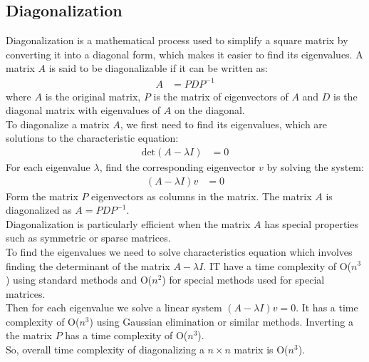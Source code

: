\documentclass{article}
\begin{document}
\subsection*{Diagonalization}
Diagonalization is a mathematical process used to simplify a square matrix by converting it into a diagonal form, which makes it easier to find its eigenvalues. A matrix $A$ is said to be diagonalizable if it can be written as:
\begin{align*}
    A &=PD{P^{-1}}
\end{align*}
where $A$ is the original matrix, $P$ is the matrix of eigenvectors of $A$ and $D$ is the diagonal matrix with eigenvalues of $A$ on the diagonal.
\\To diagonalize a matrix $A$, we first need to find its eigenvalues, which are solutions to the characteristic equation:
\begin{align*}
    \text{det}(A-{\lambda}I)&=0
\end{align*}
For each eigenvalue $\lambda$, find the corresponding eigenvector $v$ by solving the system:
\begin{align*}
    (A-{\lambda}I)v&=0
\end{align*}
Form the matrix $P$ eigenvectors as columns in the matrix. The matrix $A$ is diagonalized as $A=PD{P^{-1}}$.
\\Diagonalization is particularly efficient when the matrix $A$ has special properties such as symmetric or sparse matrices.
\\To find the eigenvalues we need to solve characteristics equation which involves finding the determinant of the matrix $A-{\lambda}I$. IT have a time complexity of O($n^3$) using standard methods and O($n^2$) for special methods used for special matrices.
\\Then for each eigenvalue we solve a linear system $(A-{\lambda}I)v=0$. It has a time complexity of O($n^3$) using Gaussian elimination or similar methods. Inverting a the matrix $P$ has a time complexity of O($n^3$).
\\So, overall time complexity of diagonalizing a $n{\times}n$ matrix is O($n^3$).
\end{document}
